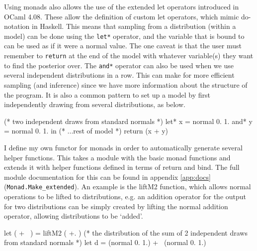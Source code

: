 Using monads also allows the use of the extended let operators introduced in OCaml 4.08. These allow the definition of custom let operators, which mimic do-notation in Haskell. This means that sampling from a distribution (within a model) can be done using the \texttt{let*} operator, and the variable that is bound to can be used as if it were a normal value. The one caveat is that the user must remember to \texttt{return} at the end of the model with whatever variable(s) they want to find the posterior over. The \texttt{and*} operator can also be used when we use several independent distributions in a row. This can make for more efficient sampling (and inference) since we have more information about the structure of the program. It is also a common pattern to set up a model by first independently drawing from several distributions, as below.
\begin{ocamlcode-in}
(* two independent draws from standard normals *)
let* x = normal 0. 1.
and* y = normal 0. 1. in
(* ...rest of model  *)
return (x + y)
\end{ocamlcode-in}
			
I define my own functor for monads in order to automatically generate several helper functions. This takes a module with the basic monad functions and extends it with helper functions defined in terms of return and bind. The full module documentation for this can be found in appendix \ref{app:docs} (\texttt{Monad.Make\_extended}). An example is the liftM2 function, which allows normal operations to be lifted to distributions, e.g. an addition operator for the output for two distributions can be simply created by lifting the normal addition operator, allowing distributions to be `added'.
	
\begin{ocamlcode-in}
let ( +~ ) = liftM2 ( +. )
(* the distribution of the sum of 2 independent draws from standard normals *)
let d = (normal 0. 1.) +~ (normal 0. 1.)
\end{ocamlcode-in}
	
